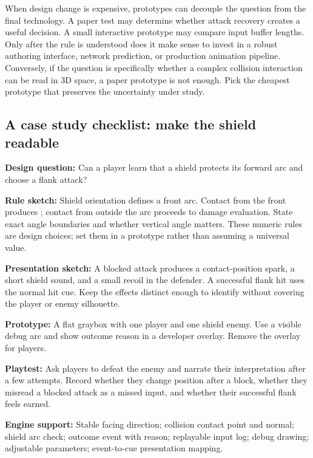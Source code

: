 When design change is expensive, prototypes can decouple the question from the final technology. A paper test may determine whether attack recovery creates a useful decision. A small interactive prototype may compare input buffer lengths. Only after the rule is understood does it make sense to invest in a robust authoring interface, network prediction, or production animation pipeline. Conversely, if the question is specifically whether a complex collision interaction can be read in 3D space, a paper prototype is not enough. Pick the cheapest prototype that preserves the uncertainty under study.

\subsection{A case study checklist: make the shield readable}\label{06-engine-ii-ch041-a-case-study-checklist-make-the-shield-readable}

\hypertarget{06-engine-ii-ch041-a-case-study-checklist-make-the-shield-readable}{}

\textbf{Design question:} Can a player learn that a shield protects its forward arc and choose a flank attack?

\textbf{Rule sketch:} Shield orientation defines a front arc. Contact from the front produces ; contact from outside the arc proceeds to damage evaluation. State exact angle boundaries and whether vertical angle matters. These numeric rules are design choices; set them in a prototype rather than assuming a universal value.

\textbf{Presentation sketch:} A blocked attack produces a contact-position spark, a short shield sound, and a small recoil in the defender. A successful flank hit uses the normal hit cue. Keep the effects distinct enough to identify without covering the player or enemy silhouette.

\textbf{Prototype:} A flat graybox with one player and one shield enemy. Use a visible debug arc and show outcome reason in a developer overlay. Remove the overlay for players.

\textbf{Playtest:} Ask players to defeat the enemy and narrate their interpretation after a few attempts. Record whether they change position after a block, whether they misread a blocked attack as a missed input, and whether their successful flank feels earned.

\textbf{Engine support:} Stable facing direction; collision contact point and normal; shield arc check; outcome event with reason; replayable input log; debug drawing; adjustable parameters; event-to-cue presentation mapping.

